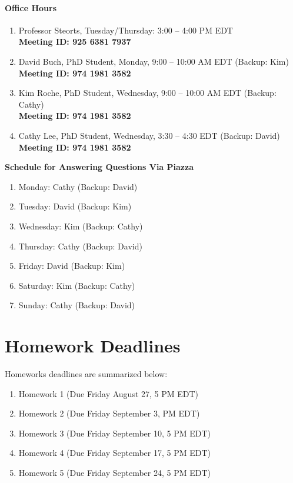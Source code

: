 \documentclass[11pt]{article}
\begin{document}
\paragraph{Office Hours}
\begin{enumerate}
\item Professor Steorts, Tuesday/Thursday: 3:00 -- 4:00 PM EDT \\
\textbf{Meeting ID: 925 6381 7937}
\item David Buch, PhD Student, Monday, 9:00 -- 10:00 AM EDT  (Backup: Kim)\\
\textbf{Meeting ID: 974 1981 3582}
\item Kim Roche, PhD Student, Wednesday, 9:00 -- 10:00 AM EDT  (Backup: Cathy)\\
\textbf{Meeting ID: 974 1981 3582}
\item Cathy Lee, PhD Student, Wednesday, 3:30 -- 4:30 EDT (Backup: David)\\
\textbf{Meeting ID: 974 1981 3582}
\end{enumerate}


\textbf{Schedule for Answering Questions Via Piazza}
\begin{enumerate}
\item Monday: Cathy (Backup: David)
\item Tuesday: David (Backup: Kim)
\item Wednesday: Kim (Backup: Cathy)
\item Thursday: Cathy (Backup: David)
\item Friday: David (Backup: Kim)
\item Saturday: Kim (Backup: Cathy)
\item Sunday: Cathy (Backup: David)
\end{enumerate}


\section{Homework Deadlines}
Homeworks deadlines are summarized below:

\begin{enumerate}
\item Homework 1 (Due Friday August 27, 5 PM EDT)
\item Homework 2 (Due Friday September 3, PM EDT)
\item Homework 3 (Due Friday September 10, 5 PM EDT)
\item Homework 4 (Due Friday September 17, 5 PM EDT)
\item Homework 5 (Due Friday September 24, 5 PM EDT)
\end{enumerate} 
\end{document}

